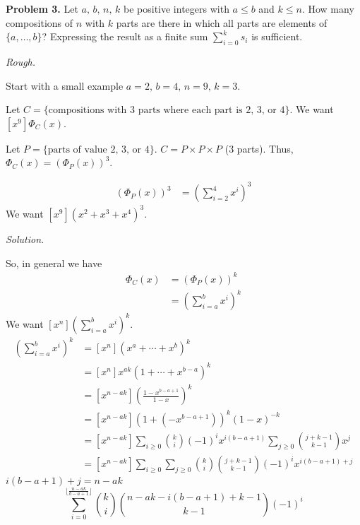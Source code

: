 \textbf{Problem 3.} Let $ a,\,b,\,n,\,k $ be positive integers with $ a\le b $
and $ k\le n $. How many compositions of $ n $ with $ k $ parts are there in which
all parts are elements of $ \{a,\ldots ,b\} $? Expressing the result as a finite
sum $ \sum\limits_{i=0}^{k} s_i $ is sufficient.

\emph{Rough.}

Start with a small example $ a=2,\,b=4,\,n=9,\,k=3 $.

Let $ C=\{\text{compositions with 3 parts where each part is 2, 3, or 4}\} $.
We want $ [x^9]\Phi_C(x) $. 

Let $ P=\{\text{parts of value 2, 3, or 4}\} $. $ C=P\times P \times P $ (3 parts).
Thus, $ \Phi_C(x)=(\Phi_P(x))^3 $.

\begin{align*}
    (\Phi_P(x))^3&=\left( \sum\limits_{i=2}^{4} x^i \right)^3
\end{align*}
We want $ [x^9](x^2+x^3+x^4)^3 $.

\emph{Solution.}

So, in general we have
\begin{align*}
    \Phi_C(x)&=\left(\Phi_P(x)\right)^k\\
    &=\left( \sum\limits_{i=a}^{b} x^i \right)^k
\end{align*}
We want $ \left[x^n\right]\left( \sum\limits_{i=a}^{b} x^i \right)^k $.
\begin{align*}
    [x^n]\left( \sum\limits_{i=a}^{b} x^i \right)^k
    &=\left[x^n\right](x^a+\cdots+x^b)^k\\
    &=\left[x^n\right]x^{ak}(1+\cdots+x^{b-a})^k\\
    &=\left[x^{n-ak}\right]\left(\frac{1-x^{b-a+1}}{1-x}\right)^k\\
    &=\left[x^{n-ak}\right]\left(1+(-x^{b-a+1})\right)^k(1-x)^{-k}\\
    &=\left[x^{n-ak}\right]\sum\limits_{i\ge 0}\binom{k}{i}(-1)^ix^{i(b-a+1)}
    \sum\limits_{j\ge 0}\binom{j+k-1}{k-1}x^{j}\\
    &=\left[x^{n-ak}\right]\sum\limits_{i\ge 0}\sum\limits_{j\ge 0}\binom{k}{i}\binom{j+k-1}{k-1}(-1)^ix^{i(b-a+1)+j}
\end{align*}
$ i(b-a+1)+j=n-ak $
\[ \sum\limits_{i=0}^{\lfloor \frac{n-ak}{b-a+1} \rfloor}
\binom{k}{i}\binom{n-ak-i(b-a+1)+k-1}{k-1}(-1)^i \]
